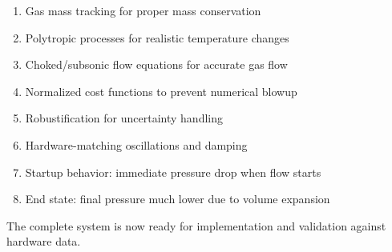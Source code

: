 \documentclass[11pt,a4paper]{article}
\begin{document}
\begin{enumerate}
    \item Gas mass tracking for proper mass conservation
    \item Polytropic processes for realistic temperature changes
    \item Choked/subsonic flow equations for accurate gas flow
    \item Normalized cost functions to prevent numerical blowup
    \item Robustification for uncertainty handling
    \item Hardware-matching oscillations and damping
    \item Startup behavior: immediate pressure drop when flow starts
    \item End state: final pressure much lower due to volume expansion
\end{enumerate}

The complete system is now ready for implementation and validation against hardware data.
\end{document}
